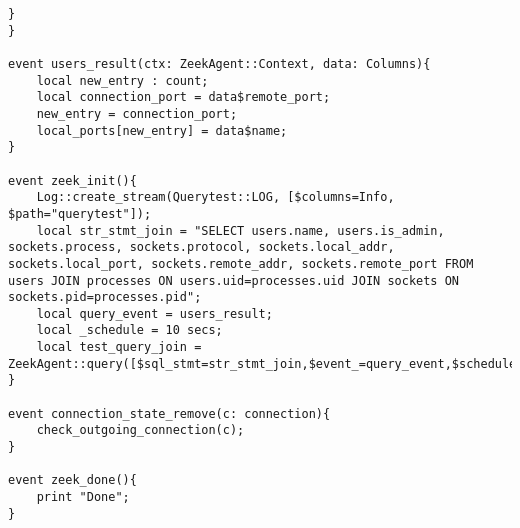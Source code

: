 \begin{lstlisting}[firstline=52,lastline=77,firstnumber=52,linerange={52-54,70-77}]
    }
}

event users_result(ctx: ZeekAgent::Context, data: Columns){
    local new_entry : count;
    local connection_port = data$remote_port;
    new_entry = connection_port;
    local_ports[new_entry] = data$name;
}

event zeek_init(){
	Log::create_stream(Querytest::LOG, [$columns=Info, $path="querytest"]);
    local str_stmt_join = "SELECT users.name, users.is_admin, sockets.process, sockets.protocol, sockets.local_addr, sockets.local_port, sockets.remote_addr, sockets.remote_port FROM users JOIN processes ON users.uid=processes.uid JOIN sockets ON sockets.pid=processes.pid";
    local query_event = users_result;
    local _schedule = 10 secs;
    local test_query_join = ZeekAgent::query([$sql_stmt=str_stmt_join,$event_=query_event,$schedule_=_schedule]);
}

event connection_state_remove(c: connection){
    check_outgoing_connection(c);
}

event zeek_done(){
    print "Done";
}
\end{lstlisting}
